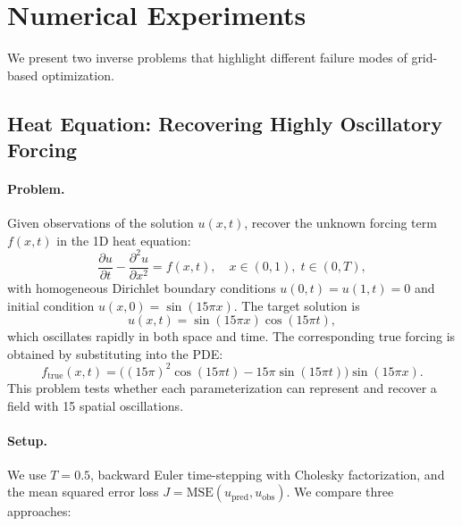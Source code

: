 \documentclass[11pt]{article}
\begin{document}
\section{Numerical Experiments}
\label{sec:experiments}

We present two inverse problems that highlight different failure modes of grid-based optimization.

\subsection{Heat Equation: Recovering Highly Oscillatory Forcing}
\label{sec:heat}

\paragraph{Problem.} Given observations of the solution $u(x,t)$, recover the unknown forcing term $f(x,t)$ in the 1D heat equation:
\begin{equation}
  \frac{\partial u}{\partial t} - \frac{\partial^2 u}{\partial x^2} = f(x,t), \quad x \in (0,1), \; t \in (0, T),
  \label{eq:heat}
\end{equation}
with homogeneous Dirichlet boundary conditions $u(0,t) = u(1,t) = 0$ and initial condition $u(x,0) = \sin(15\pi x)$. The target solution is
\begin{equation}
  u(x,t) = \sin(15\pi x) \cos(15\pi t),
\end{equation}
which oscillates rapidly in both space and time. The corresponding true forcing is obtained by substituting into the PDE:
\begin{equation}
  f_{\text{true}}(x,t) = \bigl((15\pi)^2 \cos(15\pi t) - 15\pi \sin(15\pi t)\bigr) \sin(15\pi x).
\end{equation}
This problem tests whether each parameterization can represent and recover a field with 15 spatial oscillations.

\paragraph{Setup.} We use $T = 0.5$, backward Euler time-stepping with Cholesky factorization, and the mean squared error loss $J = \text{MSE}(u_{\text{pred}}, u_{\text{obs}})$. We compare three approaches:
\end{document}
